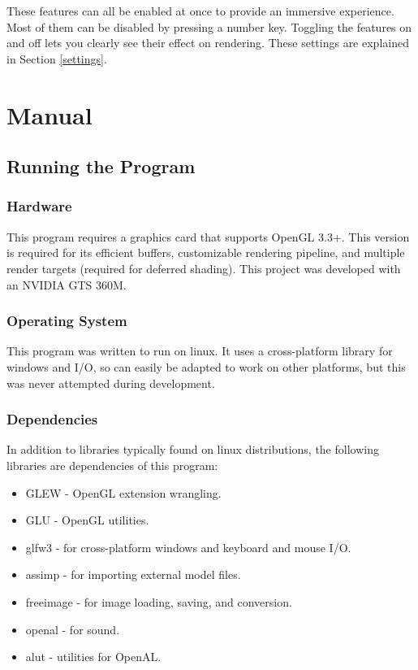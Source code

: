 \documentclass{book}
\begin{document}
    These features can all be enabled at once to provide an immersive experience. Most of them can be disabled by pressing a number key. Toggling the features on and off lets you clearly see their effect on rendering. These settings are explained in Section \ref{settings}.


\chapter{Manual}
  \section{Running the Program}
    \subsection{Hardware}
      This program requires a graphics card that supports OpenGL 3.3+.
      This version is required for its efficient buffers, customizable rendering pipeline, and multiple render targets (required for deferred shading).
      This project was developed with an NVIDIA GTS 360M.

    \subsection{Operating System}
      This program was written to run on linux. It uses a cross-platform library for windows and I/O, so can easily be adapted to work on other platforms, but this was never attempted during development.

    \subsection{Dependencies}
      In addition to libraries typically found on linux distributions, the following libraries are dependencies of this program:
      \begin{itemize}
        \item GLEW - OpenGL extension wrangling.
        \item GLU - OpenGL utilities.
        \item glfw3 - for cross-platform windows and keyboard and mouse I/O.
        \item assimp - for importing external model files.
        \item freeimage - for image loading, saving, and conversion.
        \item openal - for sound.
        \item alut - utilities for OpenAL.
      \end{itemize}
\end{document}
